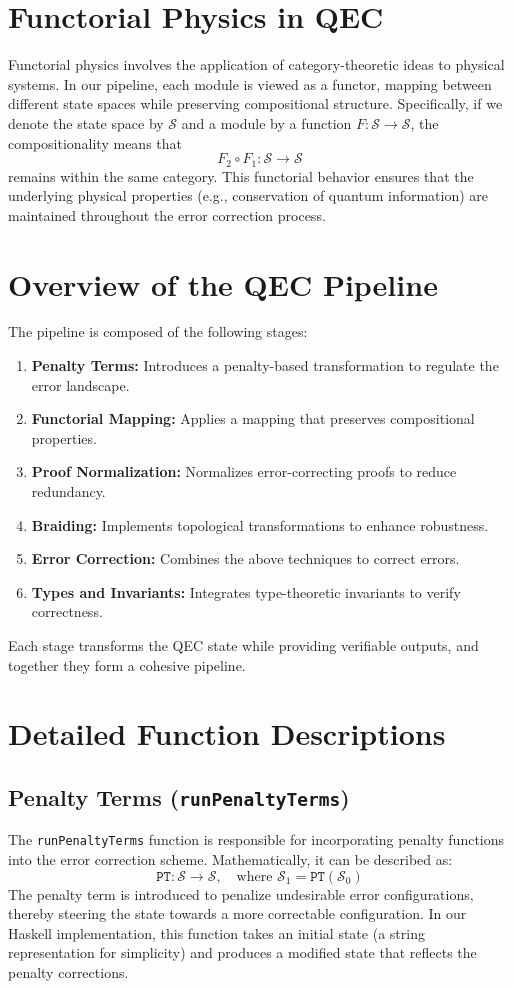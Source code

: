 \documentclass[11pt]{article}
\begin{document}
\section{Functorial Physics in QEC}
Functorial physics involves the application of category-theoretic ideas to physical systems. In our pipeline, each module is viewed as a functor, mapping between different state spaces while preserving compositional structure. Specifically, if we denote the state space by $\mathcal{S}$ and a module by a function $F: \mathcal{S} \to \mathcal{S}$, the compositionality means that
\[
F_2 \circ F_1: \mathcal{S} \to \mathcal{S}
\]
remains within the same category. This functorial behavior ensures that the underlying physical properties (e.g., conservation of quantum information) are maintained throughout the error correction process.

\section{Overview of the QEC Pipeline}
The pipeline is composed of the following stages:
\begin{enumerate}
    \item \textbf{Penalty Terms:} Introduces a penalty-based transformation to regulate the error landscape.
    \item \textbf{Functorial Mapping:} Applies a mapping that preserves compositional properties.
    \item \textbf{Proof Normalization:} Normalizes error-correcting proofs to reduce redundancy.
    \item \textbf{Braiding:} Implements topological transformations to enhance robustness.
    \item \textbf{Error Correction:} Combines the above techniques to correct errors.
    \item \textbf{Types and Invariants:} Integrates type-theoretic invariants to verify correctness.
\end{enumerate}
Each stage transforms the QEC state while providing verifiable outputs, and together they form a cohesive pipeline.

\section{Detailed Function Descriptions}

\subsection{Penalty Terms (\texttt{runPenaltyTerms})}
The \texttt{runPenaltyTerms} function is responsible for incorporating penalty functions into the error correction scheme. Mathematically, it can be described as:
\[
\texttt{PT}: \mathcal{S} \to \mathcal{S}, \quad \text{where } \mathcal{S}_1 = \texttt{PT}(\mathcal{S}_0)
\]
The penalty term is introduced to penalize undesirable error configurations, thereby steering the state towards a more correctable configuration. In our Haskell implementation, this function takes an initial state (a string representation for simplicity) and produces a modified state that reflects the penalty corrections.
\end{document}
